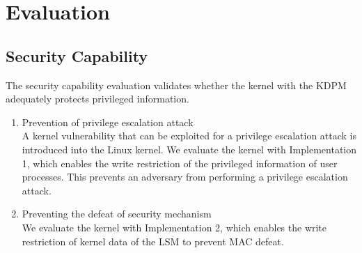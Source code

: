 \section{Evaluation} \label{seciton:evaluation}
\subsection{Security Capability}

The security capability evaluation validates whether the kernel with the
KDPM adequately protects privileged information.

\begin{enumerate}%

\item Prevention of privilege escalation attack\\
%
%
A kernel vulnerability that can be exploited for a privilege escalation attack is
introduced into the Linux kernel.
%
We evaluate the kernel with Implementation 1, which enables the write
restriction of the privileged information of user processes. This prevents an adversary
from performing a privilege escalation attack.

\item Preventing the defeat of security mechanism\\
We evaluate the kernel with Implementation 2, which enables the write
restriction of kernel data of the LSM to prevent MAC defeat.%


\end{enumerate}

